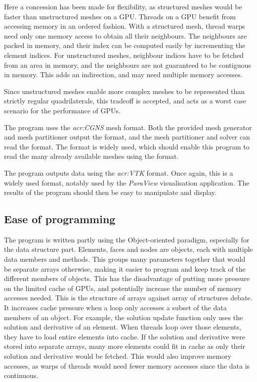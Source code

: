 Here a concession has been made for flexibility, as structured meshes would be faster than
unstructured meshes on a GPU. Threads on a GPU benefit from accessing memory in an ordered fashion.
With a structured mesh, thread warps need only one memory access to obtain all their neighbours. The
neighbours are packed in memory, and their index can be computed easily by incrementing the element
indices. For unstructured meshes, neighbour indices have to be fetched from an area in memory, and
the neighbours are not guaranteed to be contiguous in memory. This adds an indirection, and may need
multiple memory accesses.

Since unstructured meshes enable more complex meshes to be represented than strictly regular
quadrilaterals, this tradeoff is accepted, and acts as a worst case scenario for the performance of
GPUs.

The program uses the \textit{\acrfull{acr:CGNS}} mesh format. Both the provided mesh generator and mesh partitioner output
the format, and the mesh partitioner and solver can read the format. The format is widely used,
which should enable this program to read the many already available meshes using the format.

The program outputs data using the \textit{\acrfull{acr:VTK}} format. Once again, this is a widely
used format, notably used by the \textit{ParaView} visualisation application. The results of the
program should then be easy to manipulate and display.

\subsection{Ease of programming} \label{subsection:graphics_processing_units:data_structure:ease_of_programming}

The program is written partly using the Object-oriented paradigm, especially for the data structure
part. Elements, faces and nodes are objects, each with multiple data members and methods. This
groups many parameters together that would be separate arrays otherwise, making it easier to program
and keep track of the different members of objects. This has the disadvantage of putting more
pressure on the limited cache of GPUs, and potentially increase the number of memory accesses
needed. This is the structure of arrays against array of structures debate. It increases cache
pressure when a loop only accesses a subset of the data members of an object. For example, the
solution update function only uses the solution and derivative of an element. When threads loop over
those elements, they have to load entire elements into cache. If the solution and derivative were
stored into separate arrays, many more elements could fit in cache as only their solution and
derivative would be fetched. This would also improve memory accesses, as warps of threads would need
fewer memory accesses since the data is continuous.

